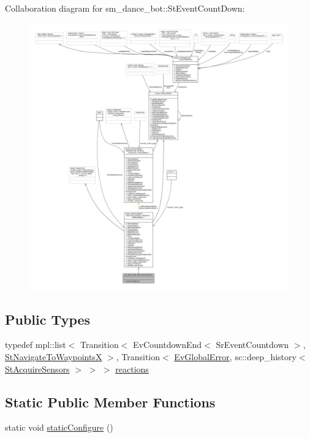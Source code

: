 Collaboration diagram for sm\+\_\+dance\+\_\+bot\+:\+:St\+Event\+Count\+Down\+:
\nopagebreak
\begin{figure}[H]
\begin{center}
\leavevmode
\includegraphics[width=350pt]{structsm__dance__bot_1_1StEventCountDown__coll__graph}
\end{center}
\end{figure}
\subsection*{Public Types}
\begin{DoxyCompactItemize}
\item 
typedef mpl\+::list$<$ Transition$<$ Ev\+Countdown\+End$<$ Sr\+Event\+Countdown $>$, \hyperlink{structsm__dance__bot_1_1StNavigateToWaypointsX}{St\+Navigate\+To\+WaypointsX} $>$, Transition$<$ \hyperlink{structsm__dance__bot_1_1EvGlobalError}{Ev\+Global\+Error}, sc\+::deep\+\_\+history$<$ \hyperlink{structsm__dance__bot_1_1StAcquireSensors}{St\+Acquire\+Sensors} $>$ $>$ $>$ \hyperlink{structsm__dance__bot_1_1StEventCountDown_ade51ecb44d2be45e1e4757abd4da456b}{reactions}
\end{DoxyCompactItemize}
\subsection*{Static Public Member Functions}
\begin{DoxyCompactItemize}
\item 
static void \hyperlink{structsm__dance__bot_1_1StEventCountDown_a6095670c25c304d3839ee3a1a24ec193}{static\+Configure} ()
\end{DoxyCompactItemize}
